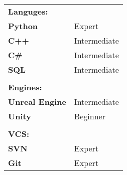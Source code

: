 \documentclass[9pt]{developercv} %
\begin{document}
\vspace{0.5cm}



\begin{center}
	\begin{tabular}{p{}p{}}
		\textbf{Languges:} 	   & \\
		\textbf{Python}        & Expert       \\
		\textbf{C++}           & Intermediate \\
		\textbf{C\#}           & Intermediate \\
		\textbf{SQL}           & Intermediate \\
		&\\
		\textbf{Engines:}      & \\
		\textbf{Unreal Engine} & Intermediate \\
		\textbf{Unity}         & Beginner \\
		&\\
		\textbf{VCS:}      & \\
		\textbf{SVN}           & Expert \\
		\textbf{Git}           & Expert \\
	\end{tabular}
\end{center}


\end{document}
